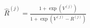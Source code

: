 ﻿\documentclass{article}
\begin{document}
\begin{preview}
\(\displaystyle
\hat{R}^{(j)}
  = \frac{1+\exp(V^{(j)})}{1+\exp(V^{(j)}-R^{(j)})}
\)
\end{preview}
\end{document}
